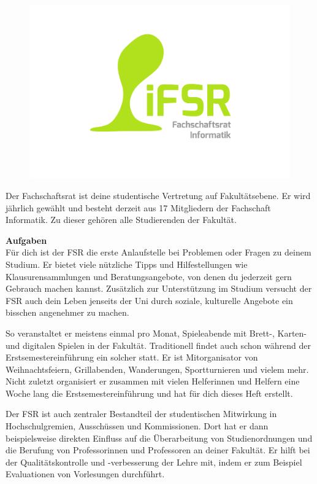
\label{sec:fachschaftsrat}
\begin{figure}\ \\[-1cm]
\flushright\includegraphics[width=\linewidth, trim=160 150 150 50, clip]{img/fsr_logo}
\end{figure}

Der Fachschaftsrat ist deine studentische Vertretung auf Fakultätsebene.
Er wird jährlich gewählt und besteht derzeit aus 17 Mitgliedern der Fachschaft Informatik. Zu dieser gehören alle Studierenden der Fakultät.
 
\textbf{Aufgaben} \\
Für dich ist der FSR die erste Anlaufstelle bei Problemen oder Fragen zu deinem Studium. Er bietet viele nützliche Tipps und Hilfestellungen wie Klausurensammlungen  und Beratungsangebote, von denen du jederzeit gern Gebrauch machen kannst. Zusätzlich zur Unterstützung im Studium versucht der FSR auch dein Leben jenseits der Uni durch soziale, kulturelle Angebote ein bisschen angenehmer zu machen.

So veranstaltet er meistens einmal pro Monat, Spieleabende mit Brett-, Karten- und digitalen Spielen in der Fakultät. Traditionell findet auch schon während der Erstsemestereinführung ein solcher statt. 
Er ist Mitorganisator von Weihnachtsfeiern, Grillabenden, Wanderungen, Sportturnieren und vielem mehr.
Nicht zuletzt organisiert er zusammen mit vielen Helferinnen und Helfern eine Woche lang die Erstsemestereinführung und hat für dich dieses Heft erstellt.

Der FSR ist auch zentraler Bestandteil der studentischen Mitwirkung in Hochschulgremien, Ausschüssen und Kommissionen. 
Dort hat er dann beispielsweise direkten Einfluss auf die Überarbeitung von Studienordnungen und die Berufung von Professorinnen und Professoren an deiner Fakultät. 
Er hilft bei der Qualitätskontrolle und -verbesserung der Lehre mit, indem er zum Beispiel Evaluationen von Vorlesungen durchführt.

